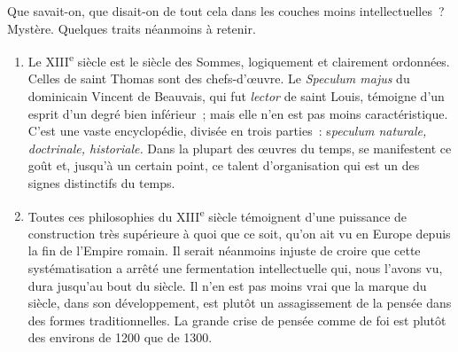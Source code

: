 \documentclass[french,twoside]{book} %
\begin{document}
\noindent Que savait-on, que disait-on de tout cela dans les couches moins intellectuelles ? Mystère. Quelques traits néanmoins à retenir.\par

\begin{enumerate}[itemsep=0pt,]
\item Le XIII\textsuperscript{e} siècle est le siècle des Sommes, logiquement et clairement ordonnées. Celles de saint Thomas sont des chefs-d’œuvre. Le {\itshape Speculum majus} du dominicain Vincent de Beauvais, qui fut {\itshape lector} de saint Louis, témoigne d’un esprit d’un degré bien inférieur ; mais elle n’en est pas moins caractéristique. C’est une vaste encyclopédie, divisée en trois parties : s{\itshape peculum naturale, doctrinale, historiale.} Dans la plupart des œuvres du temps, se manifestent ce goût et, jusqu’à un certain point, ce talent d’organisation qui est un des signes distinctifs du temps.
\item  {}
\label{p122} Toutes ces philosophies du XIII\textsuperscript{e} siècle témoignent d’une puissance de construction très supérieure à quoi que ce soit, qu’on ait vu en Europe depuis la fin de l’Empire romain. Il serait néanmoins injuste de croire que cette systématisation a arrêté une fermentation intellectuelle qui, nous l’avons vu, dura jusqu’au bout du siècle. Il n’en est pas moins vrai que la marque du siècle, dans son développement, est plutôt un assagissement de la pensée dans des formes traditionnelles. La grande crise de pensée comme de foi est plutôt des environs de 1200 que de 1300.
\end{enumerate}
\end{document}
